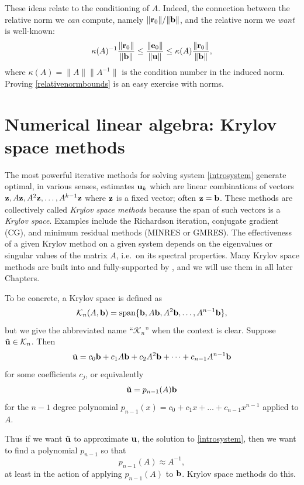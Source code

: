 These ideas relate to the conditioning of $A$.  Indeed, the connection between the relative norm we \emph{can} compute, namely $\|\mathbf{r}_0\|/\|\mathbf{b}\|$, and the relative norm we \emph{want} is well-known:
\begin{equation}
\kappa(A)^{-1} \frac{\|\mathbf{r}_0\|}{\|\mathbf{b}\|} \le \frac{\|\mathbf{e}_0\|}{\|\mathbf{u}\|} \le \kappa(A) \frac{\|\mathbf{r}_0\|}{\|\mathbf{b}\|}, \label{relativenormbounds}
\end{equation}
where $\kappa(A) = \|A\| \|A^{-1}\|$ is the condition number in the induced norm.  Proving \eqref{relativenormbounds} is an easy exercise with norms.


\section{Numerical linear algebra: Krylov space methods}

The most powerful iterative methods for solving system \eqref{introsystem} generate optimal, in various senses, estimates $\mathbf{u}_k$ which are linear combinations of vectors $\mathbf{z},A\mathbf{z},A^2\mathbf{z},\dots,A^{k-1}\mathbf{z}$ where $\mathbf{z}$ is a fixed vector; often $\mathbf{z}=\mathbf{b}$.  These methods are collectively called \emph{Krylov space methods} because the span of such vectors is a \emph{Krylov space}.  Examples include the Richardson iteration, conjugate gradient (CG), and minimum residual methods (MINRES or GMRES).  The effectiveness of a given Krylov method on a given system depends on the eigenvalues or singular values of the matrix $A$, i.e.~on its spectral properties.  Many Krylov space methods are built into and fully-supported by \PETSc, and we will use them in all later Chapters.

To be concrete, a Krylov space is defined as
\begin{equation}
    \mathcal{K}_n(A,\mathbf{b}) = \operatorname{span}\{\mathbf{b},A\mathbf{b},A^2\mathbf{b},\dots,A^{n-1}\mathbf{b}\}, \label{eq:li:krylovdefn}
\end{equation}
but we give the abbreviated name ``$\mathcal{K}_n$'' when the context is clear.  Suppose $\tilde{\mathbf{u}} \in \mathcal{K}_n$.  Then
    $$\tilde{\mathbf{u}} = c_0 \mathbf{b} + c_1 A \mathbf{b} + c_2 A^2 \mathbf{b} + \dots + c_{n-1} A^{n-1} \mathbf{b}$$
for some coefficients $c_j$, or equivalently
    $$\tilde{\mathbf{u}} = p_{n-1}(A) \mathbf{b}$$
for the $n-1$ degree polynomial $p_{n-1}(x) = c_0 + c_1 x + \dots + c_{n-1} x^{n-1}$ applied to $A$.

Thus if we want $\tilde{\mathbf{u}}$ to approximate $\mathbf{u}$, the solution to \eqref{introsystem}, then we want to find a polynomial $p_{n-1}$ so that
\begin{equation}
    p_{n-1}(A) \approx A^{-1},  \label{krylovgoal}
\end{equation}
at least in the action of applying $p_{n-1}(A)$ to $\mathbf{b}$.  Krylov space methods do this.

